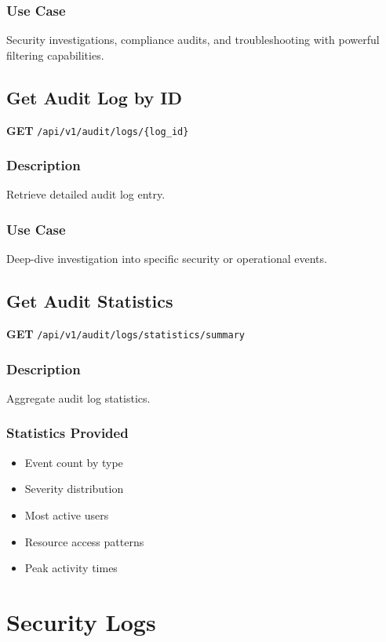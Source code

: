 \documentclass[11pt,a4paper]{report}
\begin{document}
\subsubsection{Use Case}
Security investigations, compliance audits, and troubleshooting with powerful filtering capabilities.

\subsection{Get Audit Log by ID}

\textbf{GET} \texttt{/api/v1/audit/logs/\{log\_id\}}

\subsubsection{Description}
Retrieve detailed audit log entry.

\subsubsection{Use Case}
Deep-dive investigation into specific security or operational events.

\subsection{Get Audit Statistics}

\textbf{GET} \texttt{/api/v1/audit/logs/statistics/summary}

\subsubsection{Description}
Aggregate audit log statistics.

\subsubsection{Statistics Provided}
\begin{itemize}[leftmargin=*]
    \item Event count by type
    \item Severity distribution
    \item Most active users
    \item Resource access patterns
    \item Peak activity times
\end{itemize}

\section{Security Logs}
\end{document}
